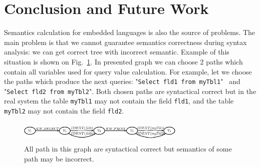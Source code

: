 \section{Conclusion and Future Work}
\label{sec:Conclusion}





 
Semantics calculation for embedded languages is also the source of problems. The main problem is 
that we cannot guarantee semantics correctness during syntax analysis: we can get correct tree 
with incorrect semantic. Example of this situation is shown on Fig.~\ref{pic7}. In presented 
graph we can choose 2 paths which contain all variables used for query value calculation. For 
example, let we choose the paths which produce the next queries: "\verb|Select fld1 from myTbl1|" \ and "\verb|Select fld2 from myTbl2|". 
Both chosen paths are syntactical correct but in the real system the table \verb|myTbl1| may not contain 
the field \verb|fld1|, and the table  \verb|myTbl2| may not contain the field \verb|fld2|.  

\begin{figure}
    \begin{center}
        \includegraphics[width=8cm,height=1.0cm]{../../graphs/semantics_example.eps}
        \caption{ All path in this graph are syntactical correct but semantics of some path may be incorrect.}
        \label{pic7}
    \end{center}
\end{figure}

